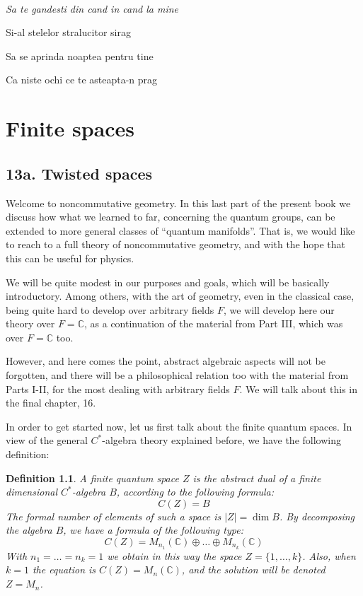 \documentclass[12pt]{amsbook}
\newtheorem{definition}[theorem]{Definition}
\begin{document}
\ \vskip50mm

\begin{center}
{\em Sa te gandesti din cand in cand la mine

Si-al stelelor stralucitor sirag

Sa se aprinda noaptea pentru tine

Ca niste ochi ce te asteapta-n prag}
\end{center}

\chapter{Finite spaces}

\section*{13a. Twisted spaces}

Welcome to noncommutative geometry. In this last part of the present book we discuss how what we learned to far, concerning the quantum groups, can be extended to more general classes of ``quantum manifolds''. That is, we would like to reach to a full theory of noncommutative geometry, and with the hope that this can be useful for physics.

\bigskip

We will be quite modest in our purposes and goals, which will be basically introductory. Among others, with the art of geometry, even in the classical case, being quite hard to develop over arbitrary fields $F$, we will develop here our theory over $F=\mathbb C$, as a continuation of the material from Part III, which was over $F=\mathbb C$ too. 

\bigskip

However, and here comes the point, abstract algebraic aspects will not be forgotten, and there will be a philosophical relation too with the material from Parts I-II, for the most dealing with arbitrary fields $F$. We will talk about this in the final chapter, 16.

\bigskip

In order to get started now, let us first talk about the finite quantum spaces. In view of the general $C^*$-algebra theory explained before, we have the following definition:

\begin{definition}
A finite quantum space $Z$ is the abstract dual of a finite dimensional $C^*$-algebra $B$, according to the following formula:
$$C(Z)=B$$
The formal number of elements of such a space is $|Z|=\dim B$. By decomposing the algebra $B$, we have a formula of the following type:
$$C(Z)=M_{n_1}(\mathbb C)\oplus\ldots\oplus M_{n_k}(\mathbb C)$$
With $n_1=\ldots=n_k=1$ we obtain in this way the space $Z=\{1,\ldots,k\}$. Also, when $k=1$ the equation is $C(Z)=M_n(\mathbb C)$, and the solution will be denoted $Z=M_n$.
\end{definition}
\end{document}
